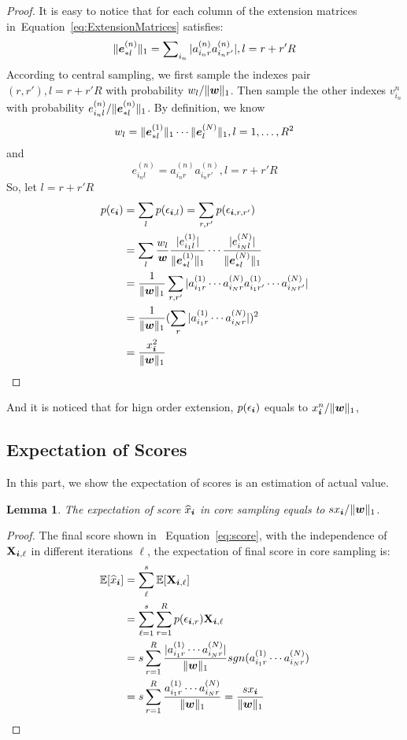 \documentclass[letterpaper]{article}
\newcommand{\Sca}[3]{{#1}^{(#2)}_{i_#2#3}}%
\newcommand{\V}[1]{{\bm{{\MakeLowercase{#1}}}}}
\newcommand{\VnC}[3]{\V{#1}^{(#2)}_{#3}}
\newcommand{\M}[1]{{\bm{\mathbf{\MakeUppercase{#1}}}}}
\newcommand{\norm}[2]{\|#1\|_{#2}}
\newcommand{\Eqn}[1]   {Equation~\ref{eq:#1}}
\newcommand{\predx}{\widehat{x}_{\V{i}}}
\newtheorem{lemma}{Lemma}
\begin{document}
\begin{proof}
It is easy to notice that
for each column of the extension matrices in~\Eqn{ExtensionMatrices} satisfies:
\[
    \norm{\VnC{e}{n}{*l}}{1} = \sum\nolimits_{i_n}|\Sca{a}{n}{r}\Sca{a}{n}{r'}|,l=r+r'R
\]
According to central sampling,
we first sample the indexes pair $(r,r'),l = r+r'R$
with probability $w_l/\norm{\V{w}}{1}$.
Then sample the other indexes $v^{n}_{i_n}$
with probability $e^{(n)}_{i_nl}/\norm{\VnC{e}{n}{*l}}{1}$.
By definition, we know
\[
w_l = \norm{\VnC{e}{1}{*l}}{1}\cdots \norm{\VnC{e}{N}{l}}{1}, l = 1,\ldots,R^2
\]
and
\[
e^{(n)}_{i_nl} = \Sca{a}{n}{r}\Sca{a}{n}{r'}, l = r+r'R
\]
So, let $l = r+r'R$
\begin{align*}
p(\epsilon_{\V{i}})
& = \sum_{l}    p(\epsilon_{\V{i},l})
  = \sum_{r,r'} p(\epsilon_{\V{i},r,r'})\\
& = \sum_{l} \frac{w_l}{\V{w}}
             \frac{|e^{(1)}_{i_1l}|}{\norm{\VnC{e}{1}{*l}}{1}}\cdots
             \frac{|e^{(N)}_{i_Nl}|}{\norm{\VnC{e}{N}{*l}}{1}} \\
& = \frac{1}{\norm{\V{W}}{1}}
    \sum_{r,r'} |\Sca{a}{1}{r} \cdots\Sca{a}{N}{r}\Sca{a}{1}{r'}\cdots\Sca{a}{N}{r'}| \\
& = \frac{1}{\norm{\V{W}}{1}}
    (\sum_{r}|\Sca{a}{1}{r}\cdots\Sca{a}{N}{r}|)^2\\
& = \frac{x_{\V{i}}^2}{\norm{\V{w}}{1}}
\end{align*}
\end{proof}
And it is noticed that for hign order extension, $p(\epsilon_{\V{i}})$ equals to $x^n_{\V{i}}/\norm{\V{w}}{1}$,
\subsection{Expectation of Scores}
In this part, we show the expectation of scores is an estimation of actual value.
\begin{lemma}\label{lem:Expectation}
The expectation of score $\widehat{x}_{\V{i}}$ in core sampling equals to $sx_{\V{i}}/\norm{\V{w}}{1}$.
\end{lemma}
\begin{proof}
    The final score shown in ~\Eqn{score},
    with the independence of $\M{X}_{\V{i},\ell}$ in different iterations $\ell$,
    the expectation of final score in core sampling is:
\begin{align*}
\mathbb{E}[\predx]
& = \sum_{\ell}^s \mathbb{E}[\M{X}_{\V{i},\ell}]\\
& = \sum_{\ell=1}^{s}\sum_{r=1}^{R} p(\epsilon_{\V{i},r})\M{X}_{\V{i},\ell}\\
& = s\sum_{r=1}^{R} \frac{|\Sca{a}{1}{r}\cdots\Sca{a}{N}{r}|}{\norm{\V{W}}{1}}sgn(\Sca{a}{1}{r}\cdots\Sca{a}{N}{r})\\
& = s\sum_{r=1}^{R} \frac{\Sca{a}{1}{r}\cdots\Sca{a}{N}{r}}{\norm{\V{W}}{1}}
= \frac{sx_{\V{i}}}{\norm{\V{w}}{1}}
\end{align*}
\end{proof}
\end{document}
